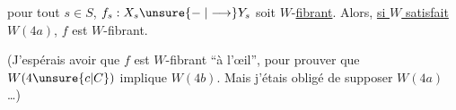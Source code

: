 pour tout $s\in S$, $f_s:X_s\unsure{\relbar|\longrightarrow}Y_s$ soit $W$-\uline{fibrant}. Alors, \uline{si $W$ satisfait} $W(4a)$, $f$ est $W$-fibrant.

(J'espérais avoir que $f$ est $W$-fibrant ``à l'œil'', pour prouver que $W(4\unsure{c|C})$ implique $W(4b)$. Mais j'étais obligé de supposer $W(4a)$ \ldots)
